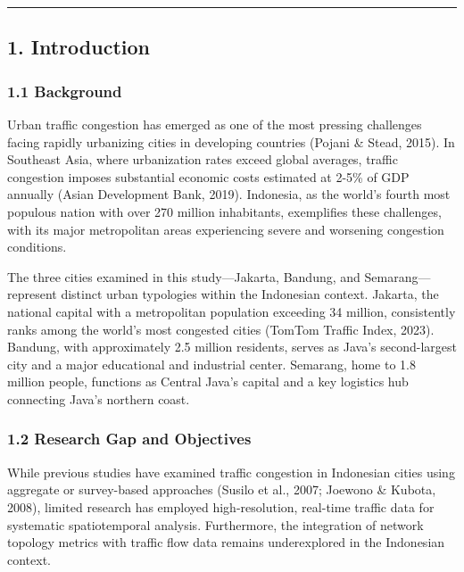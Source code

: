 \begin{center}\rule{0.5\linewidth}{0.5pt}\end{center}

\subsection{1. Introduction}\label{introduction}

\subsubsection{1.1 Background}\label{background}

Urban traffic congestion has emerged as one of the most pressing challenges facing rapidly urbanizing cities in developing countries (Pojani \& Stead, 2015). In Southeast Asia, where urbanization rates exceed global averages, traffic congestion imposes substantial economic costs estimated at 2-5\% of GDP annually (Asian Development Bank, 2019). Indonesia, as the world's fourth most populous nation with over 270 million inhabitants, exemplifies these challenges, with its major metropolitan areas experiencing severe and worsening congestion conditions.

The three cities examined in this study---Jakarta, Bandung, and Semarang---represent distinct urban typologies within the Indonesian context. Jakarta, the national capital with a metropolitan population exceeding 34 million, consistently ranks among the world's most congested cities (TomTom Traffic Index, 2023). Bandung, with approximately 2.5 million residents, serves as Java's second-largest city and a major educational and industrial center. Semarang, home to 1.8 million people, functions as Central Java's capital and a key logistics hub connecting Java's northern coast.

\subsubsection{1.2 Research Gap and Objectives}\label{research-gap-and-objectives}

While previous studies have examined traffic congestion in Indonesian cities using aggregate or survey-based approaches (Susilo et al., 2007; Joewono \& Kubota, 2008), limited research has employed high-resolution, real-time traffic data for systematic spatiotemporal analysis. Furthermore, the integration of network topology metrics with traffic flow data remains underexplored in the Indonesian context.

